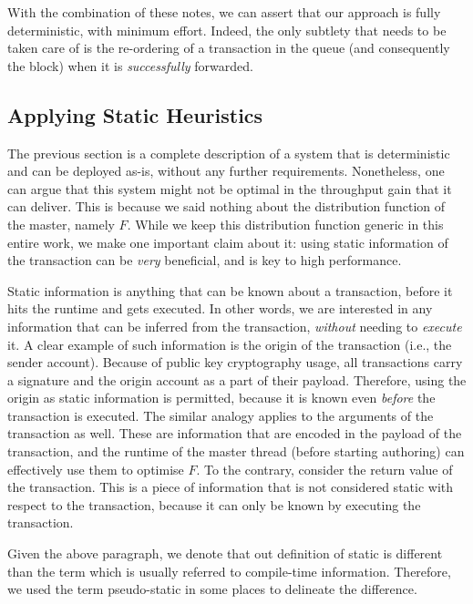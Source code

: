 With the
combination of these notes, we can assert that our approach is fully deterministic, with minimum
effort. Indeed, the only subtlety that needs to be taken care of is the re-ordering of a transaction in
the queue (and consequently the block) when it is \textit{successfully} forwarded.


\subsection{Applying Static Heuristics} \label{subsec:applying_static_hints}

The previous section is a complete description of a system that is deterministic and can be deployed
as-is, without any further requirements. Nonetheless, one can argue that this system might not be
optimal in the throughput gain that it can deliver. This is because we said nothing about the
distribution function of the master, namely $F$. While we keep this distribution function generic in
this entire work, we make one important claim about it: using static information of
the transaction can be \textit{very} beneficial, and is key to high performance.

Static information is anything that can be known about a transaction, before it hits the runtime
and gets executed. In other words, we are interested in any information that can be inferred from
the transaction, \textit{without} needing to \textit{execute} it. A clear example of such information is the
origin of the transaction (i.e., the sender account). Because of public key cryptography usage, all
transactions carry a signature and the origin account as a part of their payload. Therefore, using
the origin as static information is permitted, because it is known even \textit{before} the
transaction is executed. The similar analogy applies to the arguments of the transaction as well.
These are information that are encoded in the payload of the transaction, and the runtime of the
master thread (before starting authoring) can effectively use them to optimise $F$. To the contrary,
consider the return value of the transaction. This is a piece of information that is not considered
static with respect to the transaction, because it can only be known by executing the transaction.

\begin{remark}
	Given the above paragraph, we denote that out definition of static is different than the term
	which is usually referred to compile-time information. Therefore, we used the term pseudo-static
	in some places to delineate the difference.
\end{remark}

